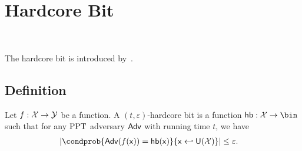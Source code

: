 \section{Hardcore Bit}~\label{sec:hardcore-bit}

The hardcore bit is introduced by~\cite{STOC:GolLev89}.

\subsection{Definition}

\begin{definition}
    Let $f:\mathcal{X} \rightarrow \mathcal{Y}$ be a function. A $(t, \varepsilon)$-hardcore bit is a function $\hb: \InSet \to \bin$ such that for any ${\text{PPT}}$ adversary ${\textsf{Adv}}$ with running time $t$, we have
    \begin{align*}
        \left|\condprob{\adv(f(\InVar)) = \hb(\InVar)}{\InVar \sample \Unif{\InSet}}\right| &\leq \varepsilon.
    \end{align*}        
\end{definition}